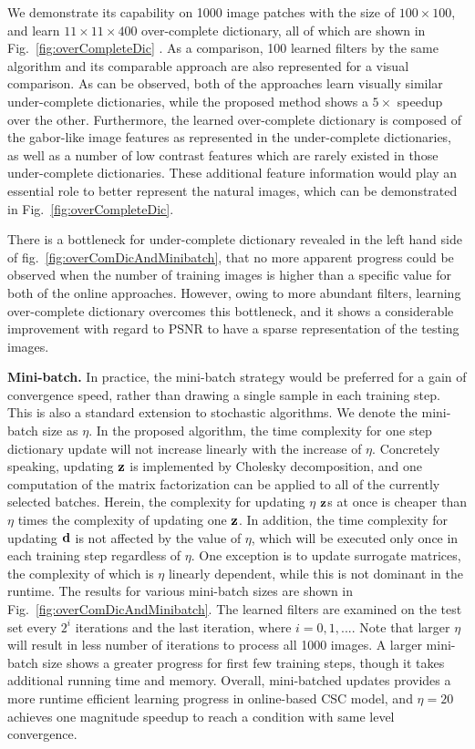 We demonstrate its capability on 1000 image patches with the size of $100 \times 100$, and learn $11 \times 11 \times 400$ over-complete dictionary, all of which are shown in Fig.~\ref{fig:overCompleteDic} . As a comparison, 100 learned filters by the same algorithm and its comparable approach are also represented for a visual comparison. As can be observed, both of the approaches learn visually similar under-complete dictionaries, while the proposed method shows a $5 \times$ speedup over the other. Furthermore, the learned over-complete dictionary is composed of the gabor-like image features as represented in the under-complete dictionaries, as well as a number of low contrast features which are rarely existed in those under-complete dictionaries. These additional feature information would play an essential role to better represent the natural images, which can be demonstrated in Fig.~\ref{fig:overCompleteDic}. 

There is a bottleneck for under-complete dictionary revealed in the left hand side of fig.~\ref{fig:overComDicAndMinibatch}, that no more apparent progress could be observed when the number of training images is higher than a specific value for both of the online approaches. However, owing to more abundant filters, learning over-complete dictionary overcomes this bottleneck, and it shows a considerable improvement with regard to PSNR to have a sparse representation of the testing images.

{\bfseries Mini-batch.} In practice, the mini-batch strategy would be preferred for a gain of convergence speed, rather than drawing a single sample in each training step. This is also a standard extension to stochastic algorithms. We denote the mini-batch size as $\eta$. In the proposed algorithm, the time complexity for one step dictionary update will not increase linearly with the increase of $\eta$. Concretely speaking, updating $\code$ is implemented by Cholesky decomposition, and one computation of the matrix factorization can be applied to all of the currently selected batches. Herein, the complexity for updating $\eta$ $\code$s at once is cheaper than $\eta$ times the complexity of updating one $\code$. In addition, the time complexity for updating $\filter$ is not affected by the value of $\eta$, which will be executed only once in each training step regardless of $\eta$. One exception is to update surrogate matrices, the complexity of which is $\eta$ linearly dependent, while this is not dominant in the runtime. The results for various mini-batch sizes are shown in Fig.~\ref{fig:overComDicAndMinibatch}. The learned filters are examined on the test set every $2^i$ iterations and the last iteration, where $i=0,1,...$. Note that larger $\eta$ will result in less number of iterations to process all 1000 images. A larger mini-batch size shows a greater progress for first few training steps, though it takes additional running time and memory. Overall, mini-batched updates provides a more runtime efficient learning progress in online-based CSC model, and $\eta=20$ achieves one magnitude speedup to reach a condition with same level convergence.


